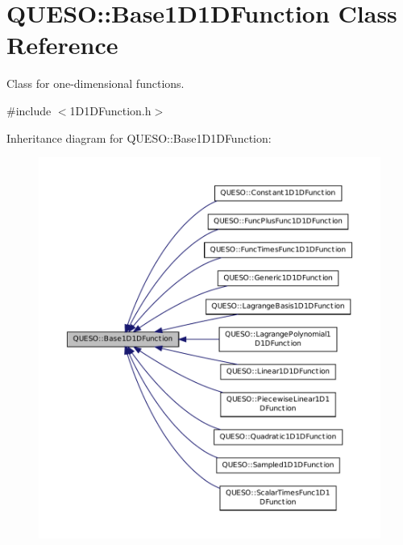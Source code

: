 \hypertarget{class_q_u_e_s_o_1_1_base1_d1_d_function}{\section{Q\-U\-E\-S\-O\-:\-:Base1\-D1\-D\-Function Class Reference}
\label{class_q_u_e_s_o_1_1_base1_d1_d_function}
}


Class for one-\/dimensional functions.  




{\ttfamily \#include $<$1\-D1\-D\-Function.\-h$>$}



Inheritance diagram for Q\-U\-E\-S\-O\-:\-:Base1\-D1\-D\-Function\-:
\nopagebreak
\begin{figure}[H]
\begin{center}
\leavevmode
\includegraphics[width=350pt]{class_q_u_e_s_o_1_1_base1_d1_d_function__inherit__graph}
\end{center}
\end{figure}
